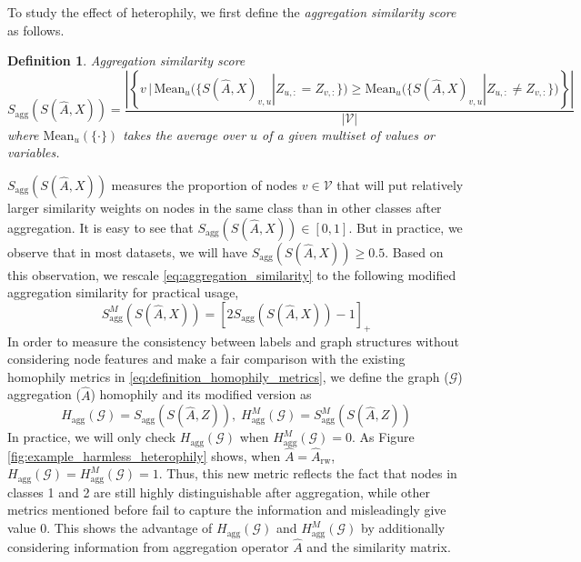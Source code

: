 \documentclass{article}
\newcommand{\0}{{\boldsymbol{0}}}
\newcommand{\6}{{\partial}}
\newcommand{\8}{{\infty}}
\newcommand{\4}{{\nabla}}
\newtheorem{definition}{Definition}
\begin{document}
To study the effect of heterophily, we first define the {\em aggregation similarity score} as follows.

\begin{definition} Aggregation similarity score \begin{equation}
\label{eq:aggregation_similarity}
    S_\text{agg}\left(S(\hat{A},X)\right) = \frac{\left| \left\{v   \,\big| \,
    \mathrm{Mean}_u\big( \{S(\hat{A},X)_{v,u} | Z_{u,:}=Z_{v,:} \}\big) 
    \geq \mathrm{Mean}_u\big(\{S(\hat{A},X)_{v,u} | Z_{u,:} \neq Z_{v,:} \} \big) \right\} \right|}{\left| \mathcal{V} \right|}
\end{equation}
where $\mathrm{Mean}_u\left(\{\cdot\}\right)$ takes the average over $u$ of a given multiset of values or variables.
\end{definition}
$S_\text{agg}(S(\hat{A},X))$ measures the proportion of nodes $v\in\mathcal{V}$ that will put relatively larger similarity weights on nodes in the same class than in other classes after aggregation. It is easy to see that $S_\text{agg}(S(\hat{A},X)) \in [0,1]$. But in practice, we observe that in most datasets, we will have $S_\text{agg}(S(\hat{A},X)) \geq 0.5$. Based on this observation, we rescale \eqref{eq:aggregation_similarity} to the following modified aggregation similarity for practical usage,
\begin{equation}
  S^M_\text{agg}\left(S(\hat{A},X)\right) = \left[2 S_\text{agg}\left(S(\hat{A},X)\right)-1\right]_{+}
\end{equation}
In order to measure the consistency between labels and graph structures without considering node features and make a fair comparison with the existing homophily metrics in \eqref{eq:definition_homophily_metrics}, we define the graph ($\mathcal{G}$) aggregation ($\hat{A}$) homophily and its modified version as
\begin{equation}
    \label{eq:aggregation_homophily_metrics}
    H_{\text{agg}}(\mathcal{G}) = S_\text{agg}\left(S(\hat{A},Z)\right), \; H_{\text{agg}}^M(\mathcal{G}) = S_\text{agg}^M\left(S(\hat{A},Z)\right)
\end{equation}
In practice, we will only check $H_{\text{agg}}(\mathcal{G})$ when $H_{\text{agg}}^M(\mathcal{G})=0$. As Figure \ref{fig:example_harmless_heterophily} shows, when $\hat{A} = \hat{A}_\text{rw}$, $H_{\text{agg}}(\mathcal{G}) = H_{\text{agg}}^M(\mathcal{G}) = 1$. Thus, this new metric reflects the fact that nodes in classes 1 and 2 are still highly distinguishable after aggregation,
while other metrics mentioned before fail to capture the information and misleadingly give value 0. This shows the advantage of $H_{\text{agg}}(\mathcal{G})$ and $H_{\text{agg}}^M(\mathcal{G})$ by additionally considering information from aggregation operator $\hat{A}$ and the similarity matrix.
\end{document}
